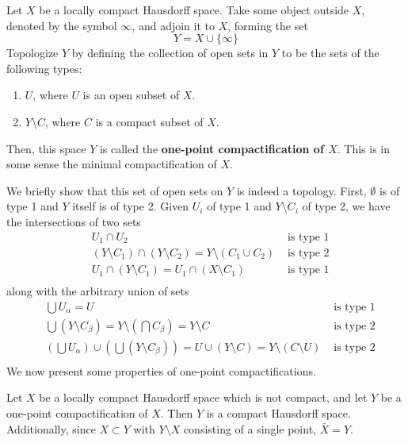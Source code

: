     \begin{definition}
    Let $X$ be a locally compact Hausdorff space. Take some object outside $X$, denoted by the symbol $\infty$, and adjoin it to $X$, forming the set
    \[Y = X \cup \{\infty\}\]
    Topologize $Y$ by defining the collection of open sets in $Y$ to be the sets of the following types:
    \begin{enumerate}
        \item $U$, where $U$ is an open subset of $X$. 
        \item $Y \setminus C$, where $C$ is a compact subset of $X$.
    \end{enumerate}
    Then, this space $Y$ is called the \textbf{one-point compactification of $X$}. This is in some sense the minimal compactification of $X$. 
    \end{definition}
    We briefly show that this set of open sets on $Y$ is indeed a topology. First, $\emptyset$ is of type 1 and $Y$ itself is of type 2. Given $U_i$ of type 1 and $Y \setminus C_i$ of type 2, we have the intersections of two sets
    \begin{align*}
        &U_1 \cap U_2 & \text{ is type 1} \\
        &(Y \setminus C_1) \cap (Y \setminus C_2) = Y \setminus (C_1 \cup C_2) & \text{ is type 2} \\
        &U_1 \cap (Y \setminus C_1) = U_1 \cap (X \setminus C_1) & \text{ is type 1} \\
    \end{align*}
    along with the arbitrary union of sets
    \begin{align*}
        &\bigcup U_\alpha = U & \text{ is type 1} \\
        &\bigcup (Y \setminus C_\beta) = Y \setminus (\bigcap C_\beta) = Y \setminus C & \text{ is type 2} \\
        &(\bigcup U_\alpha) \cup ( \bigcup (Y \setminus C_\beta)) = U \cup (Y \setminus C) = Y \setminus (C \setminus U) & \text{ is type 2} \\
    \end{align*}
    We now present some properties of one-point compactifications. 

    \begin{theorem}
    Let $X$ be a locally compact Hausdorff space which is not compact, and let $Y$ be a one-point compactification of $X$. Then $Y$ is a compact Hausdorff space. Additionally, since $X \subset Y$ with $Y \setminus X$ consisting of a single point, $\bar{X} = Y$. 
    \end{theorem}

